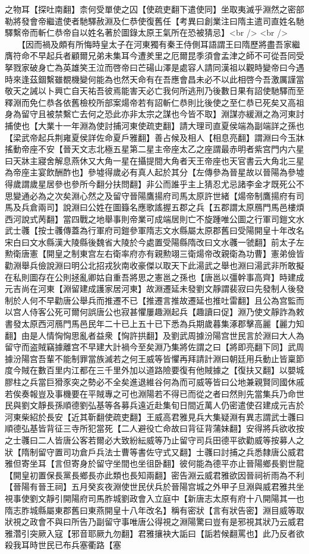 之物耳【探吐南翻】柰何受單使之囚【使疏吏翻下遣使同】坐取夷滅乎淵然之密部勒將發會帝繼遣使者馳驛赦淵及仁恭使復舊任【考異曰創業注曰隋主遣司直姓名馳驛繫帝而斬仁恭帝自以姓名著於圖錄太原王氣所在恐被猜忌】<br />
<br />
　　【因而禍及頗有所悔時皇太子在河東獨有秦王侍側耳語謂王曰隋歷將盡吾家繼膺符命不早起兵者顧爾兄弟未集耳今遭羑里之厄爾昆季須會孟津之師不可從吾同受拏戮家破身亡為英雄笑王泣而啓帝曰芒碭山澤是處容人請同漢祖以觀時變帝曰今遇時來逢茲錮繫雖覩機變何能為也然天命有在吾應會昌未必不以此相啓今吾激厲謹當敬天之誡以卜興亡自天祐吾彼焉能害天必亡我何所逃刑乃後數日果有詔使馳驛而至釋淵而免仁恭各依舊檢校所部案煬帝若有詔斬仁恭則比後使之至仁恭已死矣又高祖身為留守且被禁繫亡去何之恐此亦非太宗之謀也今皆不取】淵謀亦緩淵之為河東討捕使也【大業十一年淵為使討捕河東使疏吏翻】請大理司直夏侯端為副端詳之孫也【梁武帝起兵荆雍夏侯詳佐命夏戶雅翻】善占候及相人【相息亮翻】謂淵曰今玉牀搖動帝座不安【晉天文志北極五星第二星主帝座太乙之座謂最赤明者紫宫門内六星曰天牀主寢舍解息燕休又大角一星在攝提間大角者天王帝座也天官書云大角北三星為帝座主宴飲酬酢也】參墟得歲必有真人起於其分【左傳參為晉星故以晉陽為參墟得歲謂歲星居參也參所今翻分扶問翻】非公而誰乎主上猜忍尤忌諸李金才既死公不思變通必為之次矣淵心然之及留守晉陽鷹揚府司馬太原許世緒【煬帝制鷹揚府有司馬及兵倉兩司】說淵曰公姓在圖籙名應歌謠握五郡之兵【五郡謂太原鴈門馬邑樓煩西河說式苪翻】當四戰之地舉事則帝業可成端居則亡不旋踵唯公圖之行軍司鎧文水武士彠【按士彠傳蓋為行軍府司鎧參軍隋志文水縣屬太原郡舊曰受陽開皇十年改名宋白曰文水縣漢大陵縣後魏省大陵於今處置受陽縣隋改曰文水彠一虢翻】前太子左勲衛唐憲【開皇之制東宫左右衛率府亦有親勲翊三衛煬帝改親衛為功曹】憲弟儉皆勸淵舉兵儉說淵曰明公北招戎狄南收豪傑以取天下此湯武之舉也淵曰湯武非所敢擬在私則圖存在公則拯亂卿姑自重吾將思之憲邕之孫也【唐邕以彊幹事高齊】時建成元吉尚在河東【淵留建成護家居河東】故淵遷延未發劉文靜謂裴寂曰先發制人後發制於人何不早勸唐公舉兵而推遷不已【推遷言推故遷延也推吐雷翻】且公為宫監而以宫人侍客公死可爾何誤唐公也寂甚懼屢趣淵起兵【趣讀曰促】淵乃使文靜詐為敕書發太原西河鴈門馬邑民年二十已上五十已下悉為兵期歲暮集涿郡擊高麗【麗力知翻】由是人情恟恟思亂者益衆【恟許拱翻】及劉武周據汾陽宫世民言於淵曰大人為留守而盗賊竊據離宫不早建大計禍今至矣淵乃集將佐謂之曰【將即亮翻下同】武周據汾陽宫吾輩不能制罪當族滅若之何王威等皆懼再拜請計淵曰朝廷用兵動止皆稟節度今賊在數百里内江都在三千里外加以道路險要復有他賊據之【復扶又翻】以嬰城膠柱之兵當巨猾豕突之勢必不全矣進退維谷何為而可威等皆曰公地兼親賢同國休戚若俟奏報豈及事機要在平賊專之可也淵陽若不得已而從之者曰然則先當集兵乃命世民與劉文靜長孫順德劉弘基等各募兵遠近赴集旬日間近萬人仍密遣使召建成元吉於河東柴紹於長安【近其靳翻使疏吏翻】王威高君雅見兵大集疑淵有異志謂武士彠曰順德弘基皆背征三寺所犯當死【二人避役亡命故曰背征背蒲妹翻】安得將兵欲收按之士彠曰二人皆唐公客若爾必大致紛紜威等乃止留守司兵田德平欲勸威等按募人之狀【隋制留守置司功倉戶兵法士曹等書佐守式又翻】士彠曰討捕之兵悉隸唐公威君雅但寄坐耳【言但寄身於留守坐間也坐徂卧翻】彼何能為德平亦止晉陽鄉長劉世龍【開皇初置保長黨長鄉長亦此類也長知兩翻】密告淵云威君雅欲因晉祠祈雨為不利【晉陽有晉王祠】五月癸亥夜淵使世民伏兵於晉陽宫城之外甲子旦淵與威君雅共坐視事使劉文靜引開陽府司馬胙城劉政會入立庭中【新唐志太原有府十八開陽其一也隋志胙城縣屬東郡舊曰東燕開皇十八年改名】稱有密狀【言有狀告密】淵目威等取狀視之政會不與曰所告乃副留守事唯唐公得視之淵陽驚曰豈有是邪視其狀乃云威君雅濳引突厥入寇【邪音耶厥九勿翻】君雅攘袂大詬曰【詬若候翻罵也】此乃反者欲殺我耳時世民已布兵塞衢路【塞